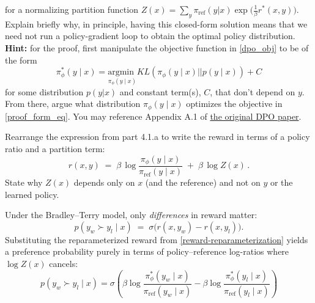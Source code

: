 \documentclass[11pt,addpoints,answers]{exam}
\begin{document}
\begin{questions}
\begin{parts}
\begin{subparts}
    for a normalizing partition function $Z(x) = \sum_y \pi_{\mathrm{ref}}(y|x)\exp\!\big(\frac{1}{\beta}r^*(x,y)\big)$. Explain briefly why, in principle, having this closed-form solution means that we need not run a policy-gradient loop to obtain the optimal policy distribution. \\
    \textbf{Hint:} for the proof, first manipulate the objective function in \eqref{dpo_obj} to be of the form  
    \begin{equation}
        \pi_{\phi}^*(y \mid x) = \underset{\pi_{\phi}(y \mid x)}{\textrm{argmin }} KL\left(\pi_{\phi}(y \mid x) || p(y \mid x)\right) + C
        \label{proof_form_eq}
    \end{equation} 
    for some distribution $p (y | x)$ and constant term(s), $C$, that don't depend on $y$. From there, argue what distribution $\pi_{\phi}(y \mid x)$ optimizes the objective in \eqref{proof_form_eq}. 
     You may reference Appendix A.1 of \href{https://arxiv.org/pdf/2305.18290}{the original DPO paper}.

    
    \begin{answer_box}[title=,height=16cm, width=14.5cm]
    \end{answer_box}

\clearpage
    \subpart[2] Rearrange the expression from part 4.1.a to write the reward in terms of a policy ratio and a partition term:
\begin{equation}
                 r(x,y)\;=\;\beta\,\log\frac{\pi_\phi(y\mid x)}{\pi_{\mathrm{ref}}(y\mid x)}\;+\;\beta\,\log Z(x)\,.
                \label{reward-reparameterization}
             \end{equation}
State why $Z(x)$ depends only on $x$ (and the reference) and not on $y$ or the learned policy.

    
    \begin{answer_box}[title=,height=6cm, width=14.5cm]
    \end{answer_box}

    \subpart[1] Under the Bradley--Terry model, only \emph{differences} in reward matter:
\[
p(y_w \succ y_l\mid x) \;=\; \sigma\!\big(r(x,y_w)-r(x,y_l)\big).
\]
Substituting the reparameterized reward from \eqref{reward-reparameterization} yields a preference probability purely in terms of policy--reference log-ratios where $\log Z(x)$ cancels:
\begin{equation}
        p\left(y_w \succ y_l \mid x \right) = \sigma\left(\beta \log \frac{\pi_{\phi}^*(y_w \mid x)}{\pi_{\textrm{ref}}(y_w \mid x)} - \beta \log \frac{\pi_{\phi}^*(y_l \mid x)}{\pi_{\textrm{ref}}(y_l \mid x)} \right)
        \label{pref_llm}
    \end{equation}



\end{subparts}
\end{parts}
\end{questions}
\end{document}
